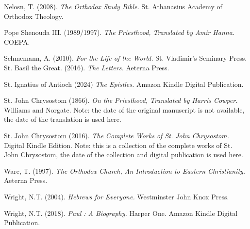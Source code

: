 \documentclass[12pt,doc]{apa7}   	%
\begin{document}
\begin{thebibliography}{15}
Nelosn, T. (2008). \emph{The Orthodox Study Bible.} St. Athanasius Academy of Orthodox Theology.

Pope Shenouda III. (1989/1997). \emph{The Priesthood, Translated by Amir Hanna.} COEPA. 

Schmemann, A. (2010). \emph{For the Life of the World.} St. Vladimir's Seminary Press.
St. Basil the Great. (2016). \emph{The Letters.} Aeterna Press.

St. Ignatius of Antioch (2024) \emph{The Epistles.} Amazon Kindle Digital Publication.

St. John Chrysostom  (1866). \emph{On the Priesthood, Translated by Harris Cowper.}  Williams and Norgate. Note: the date of the original manuscript is not available, the date of the translation is used here.

St. John Chrysostom  (2016). \emph{The Complete Works of St. John Chrysostom.}  Digital Kindle Edition. Note: this is a collection of the complete works of St. John Chrysostom, the date of the collection and digital publication is used here. 

Ware, T. (1997). \emph{The Orthodox Church, An Introduction to Eastern Christianity.} Aeterna Press.

Wright, N.T. (2004). \emph{Hebrews for Everyone.} Westminster John Knox Press.


Wright, N.T. (2018). \emph{Paul : A Biography.} Harper One.  Amazon Kindle Digital Publication.


\end{thebibliography}
\end{document}
